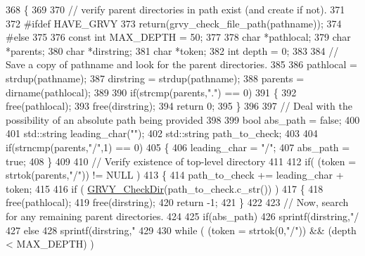 \begin{DoxyCode}
368   \{
369 
370     \textcolor{comment}{// verify parent directories in path exist (and create if not).}
371 
372 \textcolor{preprocessor}{#ifdef HAVE\_GRVY}
373 \textcolor{preprocessor}{}    \textcolor{keywordflow}{return}(grvy\_check\_file\_path(pathname));
374 \textcolor{preprocessor}{#else}
375 \textcolor{preprocessor}{}
376     \textcolor{keyword}{const} \textcolor{keywordtype}{int} MAX\_DEPTH = 50;
377     
378     \textcolor{keywordtype}{char} *pathlocal;
379     \textcolor{keywordtype}{char} *parents;
380     \textcolor{keywordtype}{char} *dirstring;
381     \textcolor{keywordtype}{char} *token;
382     \textcolor{keywordtype}{int} depth = 0;
383 
384     \textcolor{comment}{// Save a copy of pathname and look for the parent directories.}
385 
386     pathlocal = strdup(pathname);
387     dirstring = strdup(pathname);
388     parents   = dirname(pathlocal);
389 
390     \textcolor{keywordflow}{if}(strcmp(parents,\textcolor{stringliteral}{"."}) == 0)
391       \{
392         free(pathlocal);
393         free(dirstring);
394         \textcolor{keywordflow}{return} 0;
395       \}
396 
397     \textcolor{comment}{// Deal with the possibility of an absolute path being provided}
398 
399     \textcolor{keywordtype}{bool} abs\_path = \textcolor{keyword}{false};
400 
401     std::string leading\_char(\textcolor{stringliteral}{""});
402     std::string path\_to\_check;
403 
404     \textcolor{keywordflow}{if}(strncmp(parents,\textcolor{stringliteral}{"/"},1) == 0)
405       \{
406         leading\_char = \textcolor{stringliteral}{"/"};
407         abs\_path     = \textcolor{keyword}{true};
408       \}
409 
410     \textcolor{comment}{// Verify existence of top-level directory}
411 
412     \textcolor{keywordflow}{if}( (token = strtok(parents,\textcolor{stringliteral}{"/"})) != NULL )
413       \{
414         path\_to\_check += leading\_char + token;
415 
416         \textcolor{keywordflow}{if} ( \hyperlink{namespace_q_u_e_s_o_a56d7533d2177cf02d3fd761f7a22a873}{GRVY\_CheckDir}(path\_to\_check.c\_str()) )
417           \{
418             free(pathlocal);
419             free(dirstring);
420             \textcolor{keywordflow}{return} -1;
421           \}
422 
423         \textcolor{comment}{// Now, search for any remaining parent directories.}
424 
425         \textcolor{keywordflow}{if}(abs\_path)
426           sprintf(dirstring,\textcolor{stringliteral}{"/%
427         \textcolor{keywordflow}{else}
428           sprintf(dirstring,\textcolor{stringliteral}{"%
429 
430         \textcolor{keywordflow}{while} ( (token = strtok(0,\textcolor{stringliteral}{"/"})) && (depth < MAX\_DEPTH) )
}}
\end{DoxyCode}
